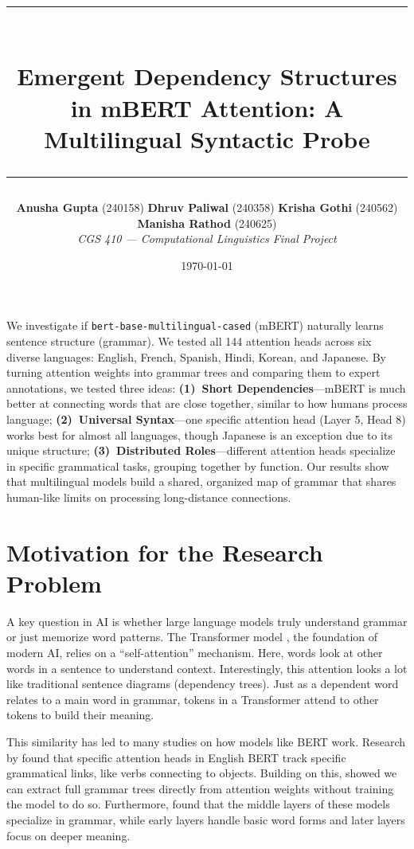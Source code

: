 \documentclass[11pt, a4paper]{article}
\title{
  \vspace{-1.5em}
  {\color{primaryblue}\rule{\linewidth}{1.5pt}}\\[4pt]
  \textbf{\large Emergent Dependency Structures in mBERT Attention: A Multilingual Syntactic Probe}\\[3pt]
  {\color{primaryblue}\rule{\linewidth}{1.5pt}}
  \vspace{-1em}
}
\author{
  {\small\textbf{Anusha Gupta} (240158)\enspace
  \textbf{Dhruv Paliwal} (240358)\enspace
  \textbf{Krisha Gothi} (240562)\enspace
  \textbf{Manisha Rathod} (240625)}\\[1pt]
  {\small\textit{CGS 410 --- Computational Linguistics Final Project}}
}
\date{\small\today}
\begin{document}
\maketitle
\vspace{-1.4em}

\begin{abstractbox}
We investigate if \texttt{bert-base-multilingual-cased} (mBERT) naturally learns sentence structure (grammar). We tested all 144 attention heads across six diverse languages: English, French, Spanish, Hindi, Korean, and Japanese. By turning attention weights into grammar trees and comparing them to expert annotations, we tested three ideas: \textbf{(1)~Short Dependencies}---mBERT is much better at connecting words that are close together, similar to how humans process language; \textbf{(2)~Universal Syntax}---one specific attention head (Layer 5, Head 8) works best for almost all languages, though Japanese is an exception due to its unique structure; \textbf{(3)~Distributed Roles}---different attention heads specialize in specific grammatical tasks, grouping together by function. Our results show that multilingual models build a shared, organized map of grammar that shares human-like limits on processing long-distance connections.
\end{abstractbox}

\vspace{2pt}

\section{Motivation for the Research Problem}

A key question in AI is whether large language models truly understand grammar or just memorize word patterns. The Transformer model \citep{vaswani2017attention}, the foundation of modern AI, relies on a ``self-attention'' mechanism. Here, words look at other words in a sentence to understand context. Interestingly, this attention looks a lot like traditional sentence diagrams (dependency trees). Just as a dependent word relates to a main word in grammar, tokens in a Transformer attend to other tokens to build their meaning.

This similarity has led to many studies on how models like BERT work. Research by \citet{clark2019what} found that specific attention heads in English BERT track specific grammatical links, like verbs connecting to objects. Building on this, \citet{htut2019attention} showed we can extract full grammar trees directly from attention weights without training the model to do so. Furthermore, \citet{raganato2018analysis} found that the middle layers of these models specialize in grammar, while early layers handle basic word forms and later layers focus on deeper meaning.
\end{document}
